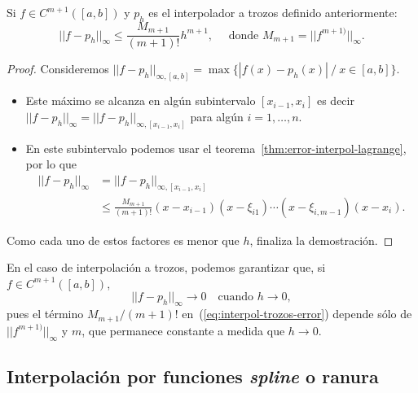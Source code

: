  \begin{theorem}
   \label{thm:interpol-trozos-error}
   Si $f\in C^{m+1}( [a,b])$ y $p_h$ es el interpolador a trozos
   definido anteriormente:
   \begin{equation}
     ||f-p_h||_\infty\le\frac{M_{m+1}}{(m+1)!}h^{m+1},
     \quad
     \text{ donde } M_{m+1}=||f^{m+1)}||_\infty.
     \label{eq:interpol-trozos-error}
   \end{equation}
 \end{theorem}

 \begin{proof}
   Consideremos $||f-p_h||_{\infty, [a,b]}=\max\{ |f(x)-p_h(x)|\ /\
   x\in[a,b]\}$.
   \begin{itemize}
   \item Este máximo se alcanza en algún subintervalo $[x_{i-1},x_{i}]$
     es decir $||f-p_h||_{\infty}=||f-p_h||_{\infty, [x_{i-1},x_i]}$
     para algún $i=1,\dots,n$.
   \item En este subintervalo podemos usar el
     teorema~\ref{thm:error-interpol-lagrange}, por lo que
     \begin{align*}
       ||f-p_h||_\infty &= ||f-p_h||_{\infty, [x_{i-1},x_i]}  \\
       &\le\frac{M_{m+1}}{(m+1)!}
       (x-x_{i-1})(x-\xi_{i1})\cdots(x-\xi_{i,m-1})(x-x_i).
     \end{align*}
   \end{itemize}
   Como cada uno de estos factores es menor que $h$, finaliza la
   demostración.
 \end{proof}

 \begin{remark}
   \label{rk:3}
   En el caso de interpolación a trozos, podemos garantizar que, si
   $f\in C^{m+1}([a,b])$,
   \begin{equation*}
     ||f-p_h||_\infty \to 0 \quad \text{cuando } h \to 0,
   \end{equation*}
   pues el término $M_{m+1}/(m+1)!$ en~(\ref{eq:interpol-trozos-error})
   depende sólo de $||f^{m+1)}||_\infty$ y $m$, que permanece constante
   a medida que $h\to 0$.
 \end{remark}

 \subsection{Interpolación por funciones \textit{spline} o ranura}
 \label{sec:splines}

